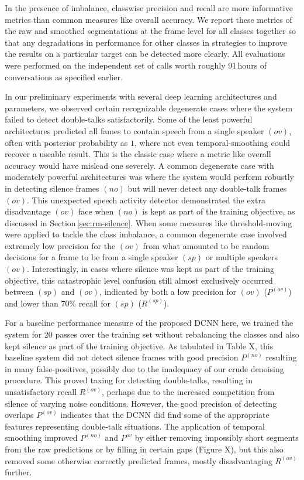 \documentclass[a4paper]{article}
\begin{document}
In the presence of imbalance, classwise precision and recall are more informative metrics than common measures like overall accuracy.
We report these metrics of the raw and smoothed segmentations at the frame level for all classes together so that any degradations in performance for other classes in strategies to improve the results on a particular target can be detected more clearly.
All evaluations were performed on the independent set of calls worth roughly 91\,hours of conversations as specified earlier.

In our preliminary experiments with several deep learning architectures and parameters,
we observed certain recognizable degenerate cases where the system failed to detect double-talks satisfactorily.
Some of the least powerful architectures predicted all fames to contain speech from a single speaker $(ov)$,
often with posterior probability as $1$, where not even temporal-smoothing could recover a useable result.
This is the classic case where a metric like overall accuracy would have mislead one severely.
A common degenerate case with moderately powerful architectures was where the system would perform robustly in detecting silence frames $(no)$ but will never detect any double-talk frames $(ov)$.
This unexpected speech activity detector demonstrated the extra disadvantage $(ov)$ face when $(no)$ is kept as part of the training objective, as discussed in Section\,\ref{sec:rm-silence}.
When some measures like threshold-moving were applied to tackle the class imbalance,
a common degenerate case involved extremely low precision for the $(ov)$ from what amounted to be random decisions for a frame to be from a single speaker $(sp)$ or multiple speakers $(ov)$.
Interestingly, in cases where silence was kept as part of the training objective,
this catastrophic level confusion still almost exclusively occurred between $(sp)$ and $(ov)$,
indicated by both a low precision for $(ov)$ ($P^{(ov)}$) and lower than 70\% recall for $(sp)$ ($R^{(sp)}$).

For a baseline performance measure of the proposed DCNN here,
we trained the system for 20 passes over the training set without rebalancing the classes and also kept silence as part of the training objective.
As tabulated in Table X,  %
this baseline system did not detect silence frames with good precision $P^{(no)}$ resulting in many false-positives,
possibly due to the inadequacy of our crude denoising procedure.
This proved taxing for detecting double-talks, resulting in unsatisfactory recall $R^{(ov)}$,
perhaps due to the increased competition from silence of varying noise conditions.
However, the good precision of detecting overlaps $P^{(ov)}$ indicates that the DCNN did find some of the appropriate features representing double-talk situations.
The application of temporal smoothing improved $P^{(no)}$ and $P^{ov}$ by either removing impossibly short segments from the raw predictions or by filling in certain gaps (Figure X),  %
but this also removed some otherwise correctly predicted frames, mostly disadvantaging $R^{(ov)}$ further.
\end{document}
